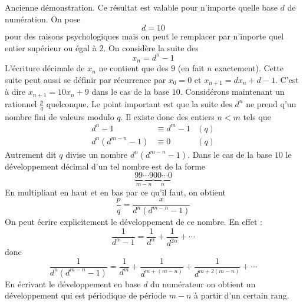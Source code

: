 Ancienne démonstration.
Ce résultat est valable pour n'importe quelle base $d$ de numération. On pose 
\begin{displaymath}
 d =10
\end{displaymath}
pour des raisons psychologiques mais on peut le remplacer par n'inporte quel entier supérieur ou égal à 2. On considère la suite des
\begin{displaymath}
 x_n = d^n -1
\end{displaymath}
L'écriture décimale de $x_n$ ne contient que des $9$ (en fait $n$ exactement). Cette suite peut aussi se définir par récurrence par $x_0=0$ et $x_{n+1}=d x_n + d-1$. C'est à dire $x_{n+1}=10 x_n + 9$ dans le cas de la base $10$.\newline
Considérons maintenant un rationnel $\frac{p}{q}$ quelconque. \newline
Le point important est que la suite des $d^n$ ne prend q'un nombre fini de valeurs  modulo $q$.\newline
Il existe donc des entiers $n<m$ tels que
\begin{align*}
 d^n -1 &\equiv  d^m -1 &(q) \\
 d^{n}(d^{m-n} -1) &\equiv 0 &(q) 
\end{align*}
Autrement dit $q$ divise un nombre $d^{n}(d^{m-n} -1)$. Dans le cas de la base $10$ le développement décimal d'un tel nombre est de la forme
\begin{displaymath}
 \underbrace{99\cdots 9}_{m-n}\underbrace{00\cdots0}_n
\end{displaymath}
En multipliant en haut et en bas par ce qu'il faut, on obtient
\begin{displaymath}
 \dfrac{p}{q} = \dfrac{x}{d^{n}(d^{m-n} -1)}
\end{displaymath}
On peut écrire explicitement le développement de ce nombre. En effet :
\begin{displaymath}
 \dfrac{1}{d^\alpha -1}= \dfrac{1}{d^\alpha} + \dfrac{1}{d^{2\alpha}} + \cdots
\end{displaymath}
donc 
\begin{displaymath}
 \dfrac{1}{d^{n}(d^{m-n} -1)}= \dfrac{1}{d^m} + \dfrac{1}{d^{m+(m-n)}} + \dfrac{1}{d^{m+2(m-n)}}+ \cdots
\end{displaymath}
En écrivant le développement en base $d$ du numérateur on obtient un développement qui est périodique de période $m-n$ à partir d'un certain rang.

